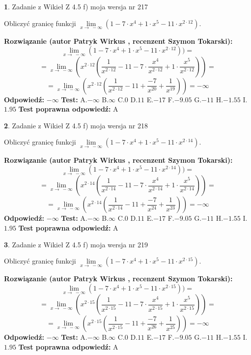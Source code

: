 \documentclass[12pt, a4paper]{article}
\theoremstyle{definition} %
\newtheorem{zad}{}
\newcommand{\zadStart}[1]{\begin{zad}#1\newline}
\newcommand{\zadStop}{\end{zad}}
\newcommand{\rozwStart}[2]{\noindent \textbf{Rozwiązanie (autor #1 , recenzent #2): }\newline}
\newcommand{\rozwStop}{\newline}
\newcommand{\odpStart}{\noindent \textbf{Odpowiedź:}\newline}
\newcommand{\odpStop}{\newline}
\newcommand{\testStart}{\noindent \textbf{Test:}\newline}
\newcommand{\testStop}{\newline}
\newcommand{\kluczStart}{\noindent \textbf{Test poprawna odpowiedź:}\newline}
\newcommand{\kluczStop}{\newline}
\begin{document}
\zadStart{Zadanie z Wikieł Z 4.5 f) moja wersja nr 217}


Obliczyć granicę funkcji  $\lim\limits_{x\to\ -\infty}(1 - 7 \cdot x^{4}+1 \cdot x^{5}- 11 \cdot x^{2\cdot12})$.
\zadStop
\rozwStart{Patryk Wirkus}{Szymon Tokarski}
$$\lim\limits_{x\to\ -\infty}(1 - 7 \cdot x^{4}+1 \cdot x^{5}- 11 \cdot x^{2\cdot12}))=$$
$$=\lim\limits_{x\to\ -\infty}(x^{2\cdot12}(\frac{1}{x^{2\cdot12}}-11 -7 \cdot \frac{x^{4}}{x^{2\cdot12}}+1 \cdot \frac{x^{5}}{x^{2\cdot12}}))=$$
$$=\lim\limits_{x\to\ -\infty}(x^{2\cdot12}(\frac{1}{x^{2\cdot12}}-11 + \frac{-7}{x^{20}}+ \frac{1}{x^{19}}))=-\infty$$
\rozwStop
\odpStart
$-\infty$
\odpStop
\testStart
A.$-\infty$ B.$\infty$ C.$0$ D.$11$ E.$-17$
F.$-9.05$ G.$-11$
H.$-1.55$
I.$1.95$
\testStop
\kluczStart
A
\kluczStop



\zadStart{Zadanie z Wikieł Z 4.5 f) moja wersja nr 218}


Obliczyć granicę funkcji  $\lim\limits_{x\to\ -\infty}(1 - 7 \cdot x^{4}+1 \cdot x^{5}- 11 \cdot x^{2\cdot14})$.
\zadStop
\rozwStart{Patryk Wirkus}{Szymon Tokarski}
$$\lim\limits_{x\to\ -\infty}(1 - 7 \cdot x^{4}+1 \cdot x^{5}- 11 \cdot x^{2\cdot14}))=$$
$$=\lim\limits_{x\to\ -\infty}(x^{2\cdot14}(\frac{1}{x^{2\cdot14}}-11 -7 \cdot \frac{x^{4}}{x^{2\cdot14}}+1 \cdot \frac{x^{5}}{x^{2\cdot14}}))=$$
$$=\lim\limits_{x\to\ -\infty}(x^{2\cdot14}(\frac{1}{x^{2\cdot14}}-11 + \frac{-7}{x^{24}}+ \frac{1}{x^{23}}))=-\infty$$
\rozwStop
\odpStart
$-\infty$
\odpStop
\testStart
A.$-\infty$ B.$\infty$ C.$0$ D.$11$ E.$-17$
F.$-9.05$ G.$-11$
H.$-1.55$
I.$1.95$
\testStop
\kluczStart
A
\kluczStop



\zadStart{Zadanie z Wikieł Z 4.5 f) moja wersja nr 219}


Obliczyć granicę funkcji  $\lim\limits_{x\to\ -\infty}(1 - 7 \cdot x^{4}+1 \cdot x^{5}- 11 \cdot x^{2\cdot15})$.
\zadStop
\rozwStart{Patryk Wirkus}{Szymon Tokarski}
$$\lim\limits_{x\to\ -\infty}(1 - 7 \cdot x^{4}+1 \cdot x^{5}- 11 \cdot x^{2\cdot15}))=$$
$$=\lim\limits_{x\to\ -\infty}(x^{2\cdot15}(\frac{1}{x^{2\cdot15}}-11 -7 \cdot \frac{x^{4}}{x^{2\cdot15}}+1 \cdot \frac{x^{5}}{x^{2\cdot15}}))=$$
$$=\lim\limits_{x\to\ -\infty}(x^{2\cdot15}(\frac{1}{x^{2\cdot15}}-11 + \frac{-7}{x^{26}}+ \frac{1}{x^{25}}))=-\infty$$
\rozwStop
\odpStart
$-\infty$
\odpStop
\testStart
A.$-\infty$ B.$\infty$ C.$0$ D.$11$ E.$-17$
F.$-9.05$ G.$-11$
H.$-1.55$
I.$1.95$
\testStop
\kluczStart
A
\kluczStop
\end{document}
